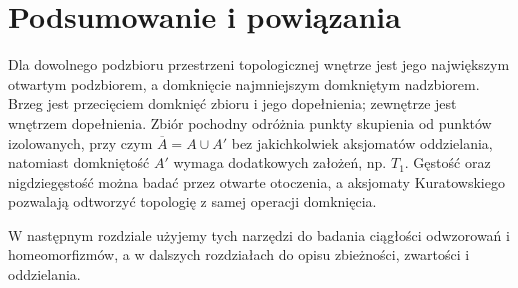 \section{Podsumowanie i powiązania}
\label{sec:topog-operacje-podsumowanie}

Dla dowolnego podzbioru przestrzeni topologicznej
wnętrze jest jego największym otwartym podzbiorem,
a domknięcie najmniejszym domkniętym nadzbiorem.
Brzeg jest przecięciem domknięć zbioru i jego dopełnienia;
zewnętrze jest wnętrzem dopełnienia. Zbiór pochodny
odróżnia punkty skupienia od punktów izolowanych,
przy czym $\overline A=A\cup A'$ bez jakichkolwiek
aksjomatów oddzielania, natomiast domkniętość
$A'$ wymaga dodatkowych założeń, np. $T_1$.
Gęstość oraz nigdziegęstość można badać przez
otwarte otoczenia, a aksjomaty Kuratowskiego
pozwalają odtworzyć topologię z samej operacji domknięcia.

W następnym rozdziale użyjemy tych narzędzi do badania
ciągłości odwzorowań i homeomorfizmów, a w dalszych
rozdziałach do opisu zbieżności, zwartości i oddzielania.
